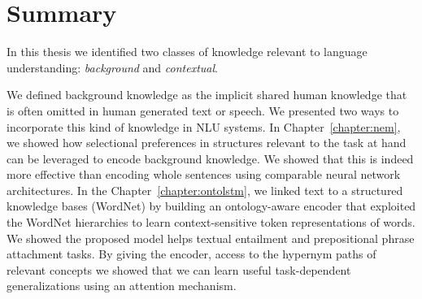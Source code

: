 % 


\section{Summary}
In this thesis we identified two classes of knowledge relevant to language understanding: \textit{background} and \textit{contextual}.

We defined background knowledge as the implicit shared human knowledge that is often omitted in human generated text or speech. We presented two ways to incorporate this kind of knowledge in NLU systems. In Chapter~\ref{chapter:nem}, we showed how selectional preferences
in structures relevant to the task at hand can be leveraged to encode background knowledge. We showed that this is indeed more effective than encoding whole sentences using comparable neural network architectures.
In the Chapter~\ref{chapter:ontolstm}, we linked text to a structured knowledge bases (WordNet) by building an ontology-aware encoder that exploited the WordNet hierarchies to learn context-sensitive token representations of words. We showed the proposed model helps textual entailment and 
prepositional phrase attachment tasks. By giving the encoder, access to the hypernym paths of relevant concepts we showed that we can learn useful task-dependent generalizations using an attention mechanism.

